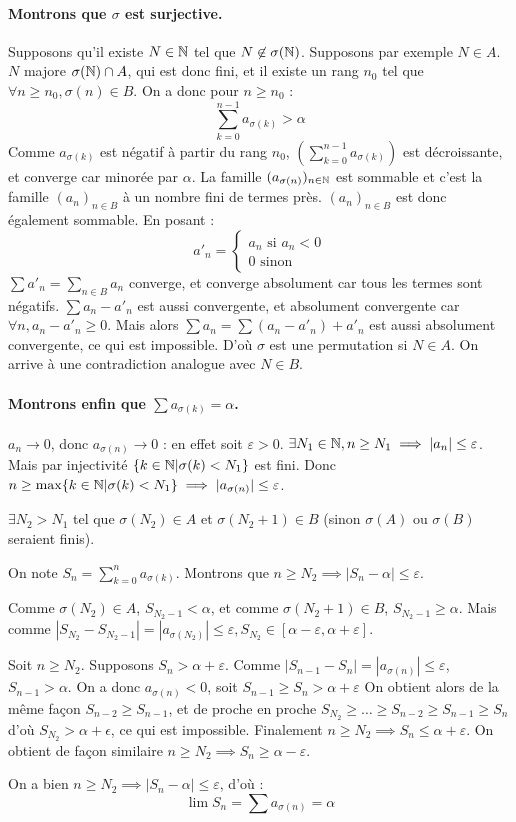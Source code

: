 \paragraph{Montrons que $\sigma$ est surjective.} Supposons qu'il existe $N\in \mathbb{N}$ tel que $N\not \in \sigma(\mathbb{N})$. Supposons par exemple $N\in A$. $N$ majore $\sigma(\mathbb{N}) \cap A$, qui est donc fini, et il existe un rang $n_0$ tel que $\forall n \geq n_0, \sigma(n)\in B$. On a donc pour $n\geq n_0$ :
$$\sum_{k=0}^{n-1} a_{\sigma(k)} > \alpha$$
Comme $a_{\sigma(k)}$ est négatif à partir du rang $n_0$, $(\sum_{k=0}^{n-1} a_{\sigma(k)})$ est décroissante, et converge car minorée par $\alpha$. La famille $(a_{\sigma(n)})_{n\in \mathbb{N}}$ est sommable et c'est la famille $(a_n)_{n\in B}$ à un nombre fini de termes près. $(a_n)_{n\in B}$ est donc également sommable. En posant :
$$a'_n=\begin{cases}
    a_n \text{ si } a_n<0 \\
    0 \text{ sinon}
\end{cases}$$
$\sum a'_n = \sum_{n\in B} a_n$ converge, et converge absolument car tous les termes sont négatifs.
$\sum a_n-a'_n$ est aussi convergente, et absolument convergente car $\forall n, a_n-a'_n\geq 0$. Mais alors $\sum a_n = \sum (a_n-a'_n)+a'_n$ est aussi absolument convergente, ce qui est impossible. D'où $\sigma$ est une permutation si $N\in A$. On arrive à une contradiction analogue avec $N\in B$. 

\paragraph{Montrons enfin que $\sum a_{\sigma(k)}=\alpha$.} $a_n \to 0$, donc $a_{\sigma(n)} \to 0$ : en effet soit $\varepsilon >0$. $\exists N_1 \in \mathbb{N}, n \geq N_1 \implies |a_n|\leq \varepsilon$. Mais par injectivité $\{k\in \mathbb{N} |\sigma(k)<N_1\}$ est fini. Donc $n\geq \max \{k\in \mathbb{N} |\sigma(k)<N_1\} \implies |a_{\sigma(n)}|\leq \varepsilon$.

$\exists N_2 > N_1$ tel que $\sigma(N_2) \in A$ et $\sigma(N_2+1) \in B$ (sinon $\sigma(A)$ ou $\sigma(B)$ seraient finis).

On note $S_n=\sum_{k=0}^n a_{\sigma(k)}$. Montrons que $n\geq N_2 \implies |S_n - \alpha|\leq \varepsilon$.

Comme $\sigma(N_2) \in A$, $S_{N_2-1} < \alpha$, et comme $\sigma(N_2+1) \in B$, $S_{N_2-1} \geq \alpha$. Mais comme $|S_{N_2}-S_{N_2-1}|=|a_{\sigma(N_2)}|\leq \varepsilon, S_{N_2} \in [\alpha-\varepsilon, \alpha+\varepsilon]$.

Soit $n\geq N_2$. Supposons $S_n > \alpha+\varepsilon$. Comme $|S_{n-1}-S_n|=|a_{\sigma(n)}|\leq \varepsilon$, $S_{n-1} > \alpha$. On a donc $a_{\sigma(n)} < 0$, soit $S_{n-1} \geq S_n > \alpha+\varepsilon$ On obtient alors de la même façon $S_{n-2} \geq S_{n-1}$, et de proche en proche $S_{N_2} \geq \dots \geq S_{n-2} \geq S_{n-1} \geq S_n$ d'où $S_{N_2} > \alpha + \epsilon$, ce qui est impossible. Finalement $n\geq N_2 \implies S_n \leq \alpha +\varepsilon$. On obtient de façon similaire $n\geq N_2 \implies S_n \geq \alpha -\varepsilon$.

On a bien $n\geq N_2 \implies |S_n-\alpha| \leq \varepsilon$, d'où :
$$\boxed{\lim S_n = \sum a_{\sigma(n)} = \alpha}$$